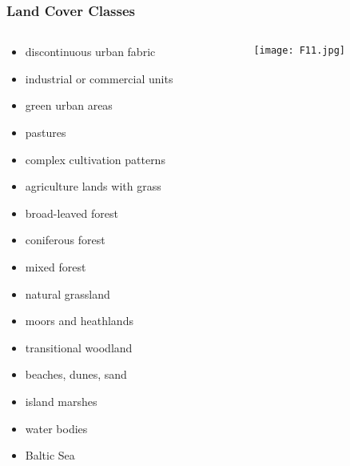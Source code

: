 \documentclass[pdflatex,compress,8pt,
	xcolor={dvipsnames,dvipsnames,svgnames,x11names,table},
	hyperref={	
	breaklinks = true, 
	pdfauthor={Lemenkova Polina}, 
	pdfsubject={Preentation}, 
	pdfcreator={Lemenkova Polina}, 
	pdfproducer={Lemenkova Polina}, 
	colorlinks=true,
	linkcolor=Tomato, 
	citecolor=DeepPink3, 
	urlcolor = NavyBlue, 
	breaklinks = true}]{beamer}
\begin{document}
\begin{frame}\frametitle{Land Cover Classes}
\begin{minipage}[0.4\textheight]{\textwidth}
\vspace{3em}
\begin{columns}[T]
\begin{column}{0.5\textwidth}
\small{\begin{itemize}
	\item discontinuous urban fabric
	\item industrial or commercial units
	\item green urban areas
	\item pastures
	\item complex cultivation patterns
	\item agriculture lands with grass
	\item broad-leaved forest
	\item coniferous forest
	\item mixed forest
	\item natural grassland
	\item moors and heathlands
	\item transitional woodland
	\item beaches, dunes, sand
	\item island marshes
	\item water bodies
	\item Baltic Sea
\end{itemize}}
\end{column}
\begin{column}{0.5\textwidth}
\begin{figure}[H]
	\centering
		\texttt{[image: F11.jpg]}
\end{figure}
\end{column}
\end{columns}
\end{minipage}
\end{frame}
\end{document}

